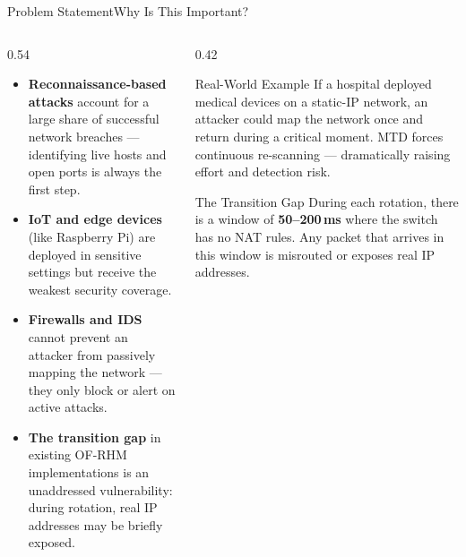\documentclass[aspectratio=169,10pt]{beamer}
\begin{document}
\begin{frame}{Problem Statement}{Why Is This Important?}
  \begin{columns}[T]
    \begin{column}{0.54\textwidth}
      \begin{itemize}\setlength\itemsep{6pt}
        \item \textbf{Reconnaissance-based attacks} account for a large share of successful network breaches --- identifying live hosts and open ports is always the first step.
        \item \textbf{IoT and edge devices} (like Raspberry Pi) are deployed in sensitive settings but receive the weakest security coverage.
        \item \textbf{Firewalls and IDS} cannot prevent an attacker from passively mapping the network --- they only block or alert on active attacks.
        \item \textbf{The transition gap} in existing OF-RHM implementations is an unaddressed vulnerability: during rotation, real IP addresses may be briefly exposed.
      \end{itemize}
    \end{column}
    \begin{column}{0.42\textwidth}
      \begin{exampleblock}{Real-World Example}
        \small If a hospital deployed medical devices on a static-IP network, an attacker could map the network once and return during a critical moment. MTD forces continuous re-scanning --- dramatically raising effort and detection risk.
      \end{exampleblock}
      \vspace{0.25cm}
      \begin{alertblock}{The Transition Gap}
        \small During each rotation, there is a window of \textbf{50--200\,ms} where the switch has no NAT rules. Any packet that arrives in this window is misrouted or exposes real IP addresses.
      \end{alertblock}
    \end{column}
  \end{columns}
\end{frame}
\end{document}
